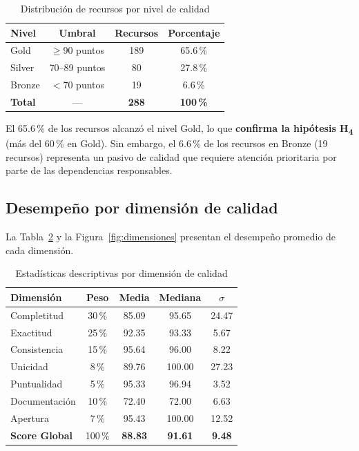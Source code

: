 \documentclass[12pt,letterpaper]{article}
\begin{document}
\begin{table}[h!]
\centering
\caption{Distribuci\'on de recursos por nivel de calidad}
\label{tab:clasificacion}
\begin{tabular}{lccc}
\toprule
\textbf{Nivel} & \textbf{Umbral} & \textbf{Recursos} & \textbf{Porcentaje} \\
\midrule
Gold   & $\geq 90$ puntos & 189 & 65.6\,\% \\
Silver & 70--89 puntos    & 80  & 27.8\,\% \\
Bronze & $< 70$ puntos    & 19  & 6.6\,\%  \\
\midrule
\textbf{Total} & --- & \textbf{288} & \textbf{100\,\%} \\
\bottomrule
\end{tabular}
\end{table}

El 65.6\,\% de los recursos alcanz\'o el nivel Gold, lo que \textbf{confirma la
hip\'otesis H\textsubscript{4}} (m\'as del 60\,\% en Gold). Sin embargo, el 6.6\,\% de
los recursos en Bronze (19 recursos) representa un pasivo de calidad que requiere
atenci\'on prioritaria por parte de las dependencias responsables.

\subsection{Desempe\~no por dimensi\'on de calidad}

La Tabla~\ref{tab:dimensiones} y la Figura~\ref{fig:dimensiones} presentan el
desempe\~no promedio de cada dimensi\'on.

\begin{table}[h!]
\centering
\caption{Estad\'isticas descriptivas por dimensi\'on de calidad}
\label{tab:dimensiones}
\begin{tabular}{lcccc}
\toprule
\textbf{Dimensi\'on} & \textbf{Peso} & \textbf{Media} & \textbf{Mediana} & \textbf{$\sigma$} \\
\midrule
Completitud    & 30\,\% & 85.09 & 95.65 & 24.47 \\
Exactitud      & 25\,\% & 92.35 & 93.33 &  5.67 \\
Consistencia   & 15\,\% & 95.64 & 96.00 &  8.22 \\
Unicidad       &  8\,\% & 89.76 & 100.00 & 27.23 \\
Puntualidad    &  5\,\% & 95.33 & 96.94 &  3.52 \\
Documentaci\'on & 10\,\% & 72.40 & 72.00 &  6.63 \\
Apertura       &  7\,\% & 95.43 & 100.00 & 12.52 \\
\midrule
\textbf{Score Global} & 100\,\% & \textbf{88.83} & \textbf{91.61} & \textbf{9.48} \\
\bottomrule
\end{tabular}
\end{table}
\end{document}
